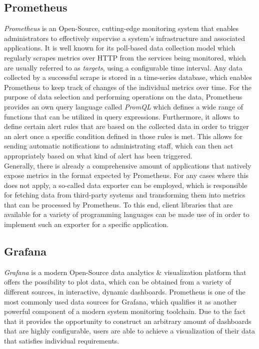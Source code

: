 \subsection{Prometheus}
\textit{Prometheus} is an Open-Source, cutting-edge monitoring system that enables administrators to effectively supervise a system's infrastructure and associated applications. It is well known for its poll-based data collection model which regularly scrapes metrics over HTTP from the services being monitored, which are usually referred to as \textit{targets}, using a configurable time interval. Any data collected by a successful scrape is stored in a time-series database, which enables Prometheus to keep track of changes of the individual metrics over time. For the purpose of data selection and performing operations on the data, Prometheus provides an own query language called \textit{PromQL} which defines a wide range of functions that can be utilized in query expressions. Furthermore, it allows to define certain alert rules that are based on the collected data in order to trigger an alert once a specific condition defined in those rules is met. This allows for sending automatic notifications to administrating staff, which can then act appropriately based on what kind of alert has been triggered.\\
Generally, there is already a comprehensive amount of applications that natively expose metrics in the format expected by Prometheus. For any cases where this does not apply, a so-called data exporter can be employed, which is responsible for fetching data from third-party systems and transforming them into metrics that can be processed by Prometheus. To this end, client libraries that are available for a variety of programming languages can be made use of in order to implement such an exporter for a specific application.

\subsection{Grafana}
\textit{Grafana} is a modern Open-Source data analytics \& visualization platform that offers the possibility to plot data, which can be obtained from a variety of different sources, in interactive, dynamic dashboards. Prometheus is one of the most commonly used data sources for Grafana, which qualifies it as another powerful component of a modern system monitoring toolchain. Due to the fact that it provides the opportunity to construct an arbitrary amount of dashboards that are highly configurable, users are able to achieve a visualization of their data that satisfies individual requirements.

